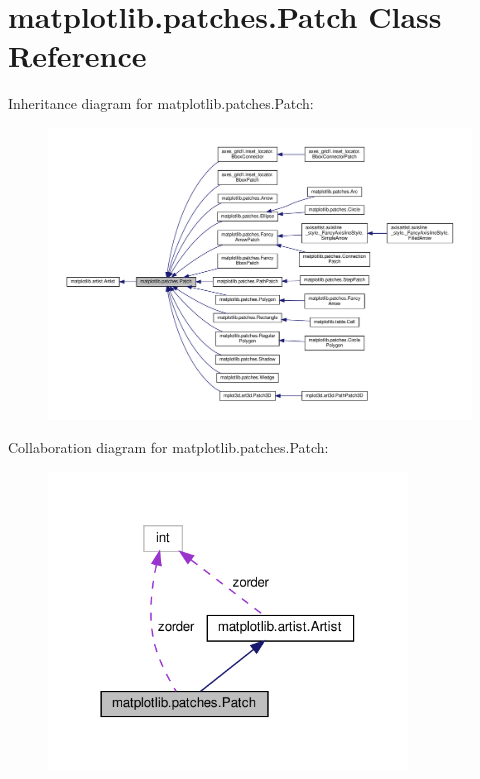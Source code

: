 \hypertarget{classmatplotlib_1_1patches_1_1Patch}{}\section{matplotlib.\+patches.\+Patch Class Reference}
\label{classmatplotlib_1_1patches_1_1Patch}


Inheritance diagram for matplotlib.\+patches.\+Patch\+:
\nopagebreak
\begin{figure}[H]
\begin{center}
\leavevmode
\includegraphics[width=350pt]{classmatplotlib_1_1patches_1_1Patch__inherit__graph}
\end{center}
\end{figure}


Collaboration diagram for matplotlib.\+patches.\+Patch\+:
\nopagebreak
\begin{figure}[H]
\begin{center}
\leavevmode
\includegraphics[width=270pt]{classmatplotlib_1_1patches_1_1Patch__coll__graph}
\end{center}
\end{figure}
